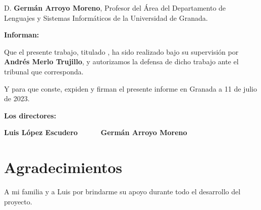 D. \textbf{Germán Arroyo Moreno}, Profesor del Área del Departamento de Lenguajes y Sistemas Informáticos de la Universidad de Granada.


\vspace{0.5cm}

\textbf{Informan:}

\vspace{0.5cm}

Que el presente trabajo, titulado \textit{\textbf{\myTitle}},
ha sido realizado bajo su supervisión por \textbf{Andrés Merlo Trujillo}, y autorizamos la defensa de dicho trabajo ante el tribunal
que corresponda.

\vspace{0.5cm}

Y para que conste, expiden y firman el presente informe en Granada a 11 de julio de 2023.

\vspace{1cm}

\textbf{Los directores:}

\vspace{5cm}

\noindent \textbf{Luis López Escudero \ \ \ \ \ Germán Arroyo Moreno}

\chapter*{Agradecimientos}
\thispagestyle{empty}

       \vspace{1cm}


A mi familia y a Luis por brindarme su apoyo durante todo el desarrollo del proyecto.

